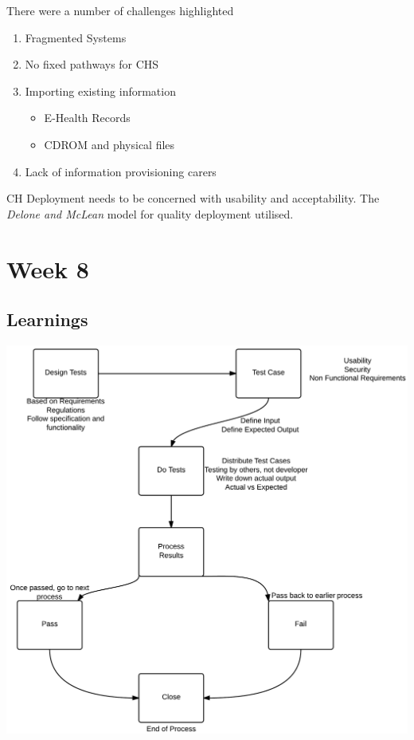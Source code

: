 There were a number of challenges highlighted

\begin{enumerate}
\item Fragmented Systems
\item No fixed pathways for CHS
\item Importing existing information
\begin{itemize}
\item E-Health Records
\item CDROM and physical files
\end{itemize}
\item Lack of information provisioning carers
\end{enumerate}

CH Deployment needs to be concerned with usability and acceptability. The \textit{Delone and McLean} model for quality deployment utilised.
\chapter{Week 8}

\section{Learnings}
\begin{center}
\includegraphics[scale=0.24]{testing.png}
\end{center}

